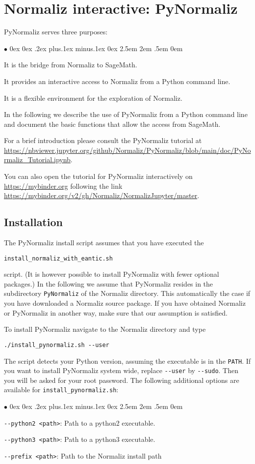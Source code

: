 \documentclass[12pt,a4paper]{scrartcl}
\newcommand{\stdli}{ \topsep0ex \partopsep0ex %
\parsep.2ex plus.1ex minus.1ex \itemsep0ex%
\leftmargin2.5em \labelwidth2em \labelsep.5em \rightmargin0em}%
\renewenvironment{itemize}{\begin{list}{{$\bullet$}}{\stdli}}{\end{list}}
\theoremstyle{definition}
\begin{document}
\newpage

\section{Normaliz interactive: PyNormaliz}\label{PyNormaliz}

\begin{small}
	
PyNormaliz serves three purposes:
\begin{itemize}
	\item It is the bridge from Normaliz to SageMath.
	\item It provides an interactive access to Normaliz from a Python command line.
	\item It is a flexible environment for the exploration of Normaliz.
\end{itemize}
In the following we describe the use of PyNormaliz from a Python command line and document the basic functions that allow the access from SageMath.

For a brief introduction please consult the PyNormaliz tutorial at \url{https://nbviewer.jupyter.org/github/Normaliz/PyNormaliz/blob/main/doc/PyNormaliz_Tutorial.ipynb}.

You can also open the tutorial for PyNormaliz interactively on \url{https://mybinder.org} following the link \url{https://mybinder.org/v2/gh/Normaliz/NormalizJupyter/master}.

\subsection{Installation}

The PyNormaliz install script assumes that you have executed the
\begin{center}
	\verb|install_normaliz_with_eantic.sh|
\end{center}
script. (It is however possible to install PyNormaliz with fewer optional packages.) In the following we assume that PyNormaliz resides in the subdirectory \verb|PyNormaliz| of the Normaliz directory. This automatically the case if you have downloaded a Normaliz source package. If you have obtained Normaliz or PyNormaliz in another way, make sure that our assumption is satisfied.

To install PyNormaliz navigate to the Normaliz directory and type
\begin{Verbatim}
./install_pynormaliz.sh --user
\end{Verbatim}
The script detects your Python version, assuming the executable is in the \verb|PATH|. If you want to install PyNormaliz system wide,
replace \verb|--user| by \verb|--sudo|. Then you will be asked for your root password.
The following additional options are available for \verb|install_pynormaliz.sh|:
\begin{itemize}
	\item \verb|--python2 <path>|: Path to a python2 executable.
	\item \verb|--python3 <path>|: Path to a python3 executable.
	\item \verb|--prefix <path>|: Path to the Normaliz install path
\end{itemize}


\end{small}
\end{document}
